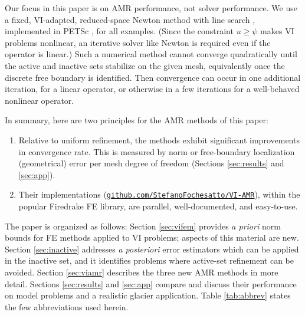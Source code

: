 \documentclass[]{interact}
\theoremstyle{plain}%
\theoremstyle{definition}
\theoremstyle{remark}
\begin{document}
Our focus in this paper is on AMR performance, not solver performance.  We use a fixed, VI-adapted, reduced-space Newton method with line search \cite{BensonMunson2006}, implemented in PETSc \cite{petsc-user-ref}, for all examples.  (Since the constraint $u \geq \psi$ makes VI problems nonlinear, an iterative solver like Newton is required even if the operator is linear.)  Such a numerical method cannot converge quadratically until the active and inactive sets stabilize on the given mesh, equivalently once the discrete free boundary is identified.  Then convergence can occur in one additional iteration, for a linear operator, or otherwise in a few iterations for a well-behaved nonlinear operator.

In summary, here are two principles for the AMR methods of this paper:
\renewcommand{\labelenumi}{\arabic{enumi}.}
\begin{enumerate}
\item Relative to uniform refinement, the methods exhibit significant improvements in convergence rate.  This is measured by norm or free-boundary localization (geometrical) error per mesh degree of freedom (Sections \ref{sec:results} and \ref{sec:app}).
\item Their implementations (\href{https://github.com/StefanoFochesatto/VI-AMR}{{\small \texttt{github.com/StefanoFochesatto/VI-AMR}}}), within the popular Firedrake \cite{Langeetal2016} FE library, are parallel, well-documented, and easy-to-use.
\end{enumerate}

The paper is organized as follows:  Section \ref{sec:vifem} provides \emph{a priori} norm bounds for FE methods applied to VI problems; aspects of this material are new.  Section \ref{sec:inactive} addresses \emph{a posteriori} error estimators which can be applied in the inactive set, and it identifies problems where active-set refinement can be avoided.  Section \ref{sec:viamr} describes the three new AMR methods in more detail.  Sections \ref{sec:results} and \ref{sec:app} compare and discuss their performance on model problems and a realistic glacier application.  Table \ref{tab:abbrev} states the few abbreviations used herein.
\end{document}
